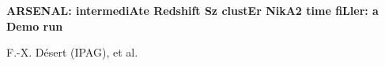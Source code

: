 \documentclass[10pt,a4paper,twoside,graphicx,color]{article}
\begin{document}
%
%
\begin{center}{\huge \bf
ARSENAL: intermediAte Redshift Sz clustEr NikA2 time fiLler: a Demo run
}\end{center}
% 
\begin{center}
  F.-X. D\'esert (IPAG), et al.
%   
% 

\end{center}
\end{document}
